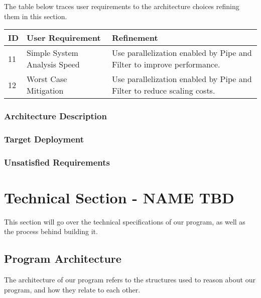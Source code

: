 \documentclass[11pt]{article}
\begin{document}
    The table below traces user requirements to the architecture choices refining them in this section.

    \begin{table}[htbp]
        \centering
        \begin{tabularx}{\textwidth}{| l | l | X |}
            \hline
            \textbf{ID} & \textbf{User Requirement} & \textbf{Refinement} \\
            \hline
            11 & Simple System Analysis Speed & Use parallelization enabled by Pipe and Filter to improve performance. \\ \hline
            12 & Worst Case Mitigation & Use parallelization enabled by Pipe and Filter to reduce scaling costs.  \\ \hline
        \end{tabularx}\label{tab:arch-choice-table}
    \end{table}

    \newpage
    \subsubsection{Architecture Description}\label{subsubsec:arch-desc}

    \subsubsection{Target Deployment}



    \subsubsection{Unsatisfied Requirements} \label{subsubsec:unsat-reqs}



    \section{Technical Section - NAME TBD}
    This section will go over the technical specifications of our program, as well as the process behind building it.
    \subsection{Program Architecture}
    The architecture of our program refers to the structures used to reason about our program, and how they relate to each other.
\end{document}

